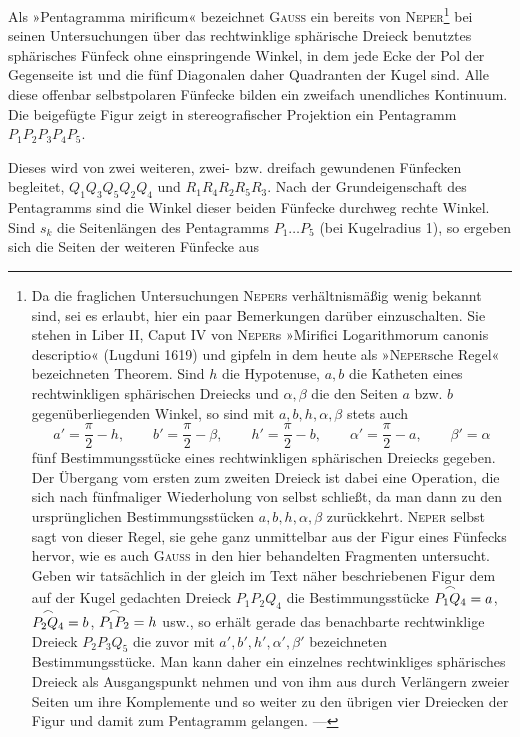 Als »Pentagramma mirificum« bezeichnet \textsc{Gauss} ein bereits von \textsc{Neper}\footnote{Da die
fraglichen Untersuchungen \textsc{Neper}s verhältnismäßig wenig bekannt sind, sei es erlaubt,
hier ein paar Bemerkungen darüber einzuschalten. Sie stehen in Liber II,
Caput IV
von \textsc{Neper}s »Mirifici Logarithmorum canonis descriptio« (Lugduni 1619) und
gipfeln in dem heute als »\textsc{Neper}sche Regel« bezeichneten Theorem. Sind $h$ die Hypotenuse,
$a, b$ die Katheten eines rechtwinkligen sphärischen Dreiecks und $\alpha, \beta$ die
den Seiten $a$ bzw. $b$ gegenüberliegenden Winkel, so sind mit $a, b, h, \alpha, \beta$ stets auch
\[
a' = \frac{\pi}{2}-h, \qquad b' = \frac{\pi}{2}-\beta, \qquad h' = \frac{\pi}{2}-b, \qquad
\alpha' = \frac{\pi}{2}-a, \qquad \beta' = \alpha
\]
fünf Bestimmungsstücke eines rechtwinkligen sphärischen Dreiecks gegeben. Der Übergang
vom ersten zum zweiten Dreieck ist dabei eine Operation, die sich nach fünfmaliger Wiederholung
von selbst schließt, da man dann zu den ursprünglichen Bestimmungsstücken
$a, b, h, \alpha, \beta$ zurückkehrt. \textsc{Neper} selbst sagt von dieser Regel, sie gehe
ganz unmittelbar aus der Figur eines Fünfecks hervor, wie es auch \textsc{Gauss} in den hier behandelten
Fragmenten untersucht. Geben wir tatsächlich in der gleich im Text näher
beschriebenen Figur dem auf der Kugel gedachten Dreieck $P_1P_2Q_4$ die Bestimmungsstücke
$\overset{\frown}{P_1Q_4}=a$, $\overset{\frown}{P_2Q_4}=b$, $\overset{\frown}{P_1P_2}=h$ usw., so erhält gerade das
benachbarte rechtwinklige Dreieck $P_2P_3Q_5$ die zuvor mit $a', b', h', \alpha',
\beta'$ bezeichneten Bestimmungsstücke. Man kann daher ein einzelnes
rechtwinkliges sphärisches Dreieck als Ausgangspunkt nehmen und von ihm aus durch
Verlängern zweier Seiten um ihre Komplemente und so weiter zu den übrigen vier Dreiecken der
Figur und damit zum Pentagramm gelangen. ---} bei seinen Untersuchungen über das rechtwinklige sphärische Dreieck benutztes sphärisches
Fünfeck ohne einspringende Winkel, in dem jede Ecke der Pol der Gegenseite
ist und die fünf Diagonalen daher Quadranten der Kugel sind. Alle diese
offenbar selbstpolaren Fünfecke bilden ein zweifach unendliches Kontinuum. Die
beigefügte Figur zeigt in stereografischer Projektion ein Pentagramm
$P_1P_2P_3P_4P_5$.

\begin{center}\end{center}

Dieses wird von zwei weiteren, zwei- bzw. dreifach gewundenen Fünfecken begleitet,
$Q_1Q_3Q_5Q_2Q_4$ und $R_1R_4R_2R_5R_3$. Nach der Grundeigenschaft des Pentagramms sind
die Winkel dieser beiden Fünfecke durchweg rechte Winkel. Sind $s_k$ die Seitenlängen des Pentagramms $P_1\ldots P_5$ (bei
Kugelradius 1), so ergeben sich die Seiten der weiteren Fünfecke aus

